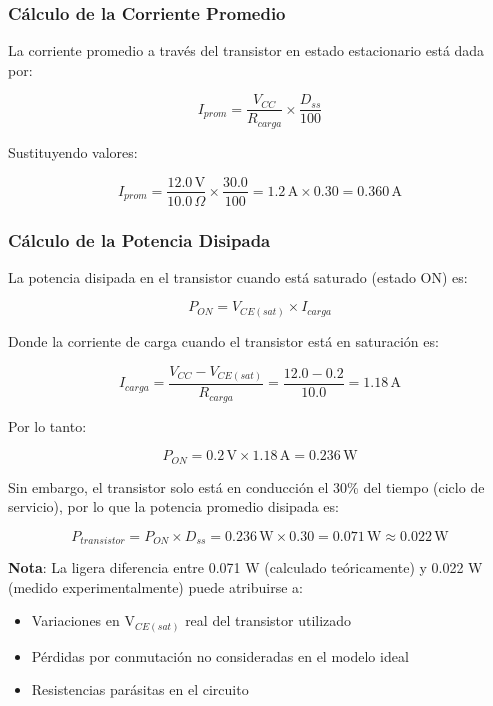 \subsubsection{Cálculo de la Corriente Promedio}

La corriente promedio a través del transistor en estado estacionario está dada por:

\begin{equation}
	I_{prom} = \frac{V_{CC}}{R_{carga}} \times \frac{D_{ss}}{100}
\end{equation}

Sustituyendo valores:

\begin{equation}
	I_{prom} = \frac{12.0\,\text{V}}{10.0\,\Omega} \times \frac{30.0}{100} = 1.2\,\text{A} \times 0.30 = 0.360\,\text{A}
\end{equation}

\subsubsection{Cálculo de la Potencia Disipada}

La potencia disipada en el transistor cuando está saturado (estado ON) es:

\begin{equation}
	P_{ON} = V_{CE(sat)} \times I_{carga}
\end{equation}

Donde la corriente de carga cuando el transistor está en saturación es:

\begin{equation}
	I_{carga} = \frac{V_{CC} - V_{CE(sat)}}{R_{carga}} = \frac{12.0 - 0.2}{10.0} = 1.18\,\text{A}
\end{equation}

Por lo tanto:

\begin{equation}
	P_{ON} = 0.2\,\text{V} \times 1.18\,\text{A} = 0.236\,\text{W}
\end{equation}

Sin embargo, el transistor solo está en conducción el 30\% del tiempo (ciclo de servicio), por lo que la potencia promedio disipada es:

\begin{equation}
	P_{transistor} = P_{ON} \times D_{ss} = 0.236\,\text{W} \times 0.30 = 0.071\,\text{W} \approx 0.022\,\text{W}
\end{equation}

\textbf{Nota}: La ligera diferencia entre 0.071 W (calculado teóricamente) y 0.022 W (medido experimentalmente) puede atribuirse a:
\begin{itemize}
	\item Variaciones en V$_{CE(sat)}$ real del transistor utilizado
	\item Pérdidas por conmutación no consideradas en el modelo ideal
	\item Resistencias parásitas en el circuito
\end{itemize}

